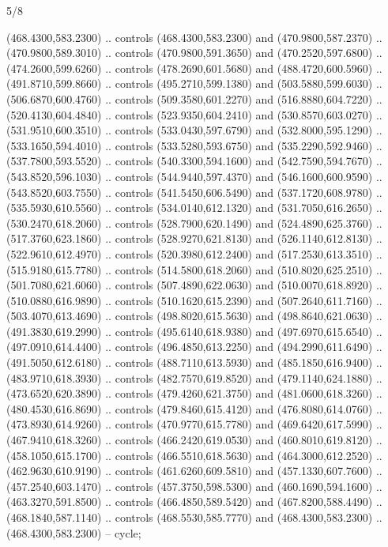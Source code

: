 \begin{flagdescription}{5/8}
\begin{scope}[shift={(m)}]
\begin{scope}[scale=\flagwidth/220,y=0.1mm, x=0.1mm, yscale=-1,shift={(-596,-360)}]
\begin{scope}[draw=black,line join=round,line cap=round,line width=0.381\lw]
\begin{scope}[line width=0.534\lw,fill=green]
 (468.4300,583.2300) .. controls (468.4300,583.2300) and
  (470.9800,587.2370) .. (470.9800,589.3010) .. controls (470.9800,591.3650) and
  (470.2520,597.6800) .. (474.2600,599.6260) .. controls (478.2690,601.5680) and
  (488.4720,600.5960) .. (491.8710,599.8660) .. controls (495.2710,599.1380) and
  (503.5880,599.6030) .. (506.6870,600.4760) .. controls (509.3580,601.2270) and
  (516.8880,604.7220) .. (520.4130,604.4840) .. controls (523.9350,604.2410) and
  (530.8570,603.0270) .. (531.9510,600.3510) .. controls (533.0430,597.6790) and
  (532.8000,595.1290) .. (533.1650,594.4010) .. controls (533.5280,593.6750) and
  (535.2290,592.9460) .. (537.7800,593.5520) .. controls (540.3300,594.1600) and
  (542.7590,594.7670) .. (543.8520,596.1030) .. controls (544.9440,597.4370) and
  (546.1600,600.9590) .. (543.8520,603.7550) .. controls (541.5450,606.5490) and
  (537.1720,608.9780) .. (535.5930,610.5560) .. controls (534.0140,612.1320) and
  (531.7050,616.2650) .. (530.2470,618.2060) .. controls (528.7900,620.1490) and
  (524.4890,625.3760) .. (517.3760,623.1860) .. controls (528.9270,621.8130) and
  (526.1140,612.8130) .. (522.9610,612.4970) .. controls (520.3980,612.2400) and
  (517.2530,613.3510) .. (515.9180,615.7780) .. controls (514.5800,618.2060) and
  (510.8020,625.2510) .. (501.7080,621.6060) .. controls (507.4890,622.0630) and
  (510.0070,618.8920) .. (510.0880,616.9890) .. controls (510.1620,615.2390) and
  (507.2640,611.7160) .. (503.4070,613.4690) .. controls (498.8020,615.5630) and
  (498.8640,621.0630) .. (491.3830,619.2990) .. controls (495.6140,618.9380) and
  (497.6970,615.6540) .. (497.0910,614.4400) .. controls (496.4850,613.2250) and
  (494.2990,611.6490) .. (491.5050,612.6180) .. controls (488.7110,613.5930) and
  (485.1850,616.9400) .. (483.9710,618.3930) .. controls (482.7570,619.8520) and
  (479.1140,624.1880) .. (473.6520,620.3890) .. controls (479.4260,621.3750) and
  (481.0600,618.3260) .. (480.4530,616.8690) .. controls (479.8460,615.4120) and
  (476.8080,614.0760) .. (473.8930,614.9260) .. controls (470.9770,615.7780) and
  (469.6420,617.5990) .. (467.9410,618.3260) .. controls (466.2420,619.0530) and
  (460.8010,619.8120) .. (458.1050,615.1700) .. controls (466.5510,618.5630) and
  (464.3000,612.2520) .. (462.9630,610.9190) .. controls (461.6260,609.5810) and
  (457.1330,607.7600) .. (457.2540,603.1470) .. controls (457.3750,598.5300) and
  (460.1690,594.1600) .. (463.3270,591.8500) .. controls (466.4850,589.5420) and
  (467.8200,588.4490) .. (468.1840,587.1140) .. controls (468.5530,585.7770) and
  (468.4300,583.2300) .. (468.4300,583.2300) -- cycle;


\end{scope}
\end{scope}
\end{scope}
\end{scope}
\end{flagdescription}
